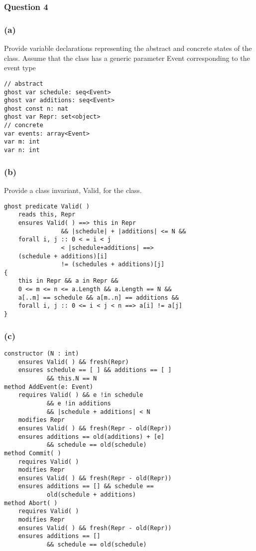 
\subsubsection{Question 4}
\subsubsection{(a)}
Provide variable declarations representing the abstract and concrete states of the class.
Assume that the class has a generic parameter Event corresponding to the event type


\begin{verbatim}
// abstract
ghost var schedule: seq<Event>
ghost var additions: seq<Event>
ghost const n: nat
ghost var Repr: set<object>
// concrete
var events: array<Event>
var m: int
var n: int
\end{verbatim}

\subsubsection{(b)}
Provide a class invariant, Valid, for the class.

\begin{verbatim}
ghost predicate Valid( )
    reads this, Repr
    ensures Valid( ) ==> this in Repr 
                && |schedule| + |additions| <= N &&
    forall i, j :: 0 < = i < j
                < |schedule+additions| ==>
    (schedule + additions)[i]
                != (schedules + additions)[j]
{
    this in Repr && a in Repr &&
    0 <= m <= n <= a.Length && a.Length == N &&
    a[..m] == schedule && a[m..n] == additions &&
    forall i, j :: 0 <= i < j < n ==> a[i] != a[j]
}
\end{verbatim}

\subsubsection{(c)}

\begin{verbatim}
constructor (N : int)
    ensures Valid( ) && fresh(Repr)
    ensures schedule == [ ] && additions == [ ]
            && this.N == N
method AddEvent(e: Event)
    requires Valid( ) && e !in schedule
            && e !in additions 
            && |schedule + additions| < N
    modifies Repr
    ensures Valid( ) && fresh(Repr - old(Repr))
    ensures additions == old(additions) + [e]
            && schedule == old(schedule)
method Commit( )
    requires Valid( )
    modifies Repr
    ensures Valid( ) && fresh(Repr - old(Repr))
    ensures additions == [] && schedule ==
            old(schedule + additions)
method Abort( )
    requires Valid( )
    modifies Repr
    ensures Valid( ) && fresh(Repr - old(Repr))
    ensures additions == []
            && schedule == old(schedule)
\end{verbatim}